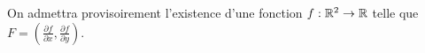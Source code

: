 \documentclass{article}
\begin{document}
On admettra provisoirement l'existence d'une fonction $f:\mathbb{R}^2 \to \mathbb{R}$ telle que $F = (\frac{\partial f}{\partial x} , \frac{\partial f}{\partial y})$.
\end{document}
